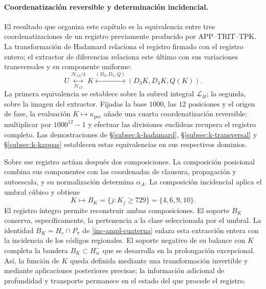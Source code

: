 \paragraph{Coordenatización reversible y determinación incidencial.}
\label{ampl-alfa-k-intro-reversible}
El resultado que organiza este capítulo es la equivalencia entre tres
coordenatizaciones de un registro previamente producido por
APP--TRIT--TPK. La transformación de Hadamard relaciona el registro
firmado con el registro entero; el extractor de diferencias relaciona
este último con sus variaciones transversales y su componente uniforme:
\[
 U\underset{\mathcal H_{12}}{\overset{\mathcal H_{12}/4}{\longleftrightarrow}}K
 \overset{(D_3,D_4,Q)}{\longleftrightarrow}
 (D_3K,D_4K,Q(K)).
\]
La primera equivalencia se establece sobre la subred integral
$\mathcal L_H$; la segunda, sobre la imagen del extractor. Fijadas la
base $1000$, las $12$ posiciones y el origen de fase, la evaluación
$K\mapsto\kappa_{\mathrm{per}}$ añade una cuarta coordenatización
reversible: multiplicar por $1000^{12}-1$ y efectuar las divisiones
euclídeas recupera el registro completo. Las demostraciones de
\S\ref{subsec:k-hadamard}, \S\ref{subsec:k-transversal} y
\S\ref{subsec:k-kappas} establecen estas equivalencias en sus respectivos
dominios.

Sobre ese registro actúan después dos composiciones. La composición
posicional combina sus componentes con las coordenadas de clausura,
propagación y autoescala, y su normalización determina $\alpha_A$. La
composición incidencial aplica el umbral cúbico y obtiene
\[
 K\longmapsto B_K=\{j:K_j\geq729\}=\{4,6,9,10\}.
\]
El registro íntegro permite reconstruir ambas composiciones. El soporte
$B_K$ conserva, específicamente, la pertenencia a la clase seleccionada
por el umbral. La identidad $B_K=H_e\cap P_\pi$ de
\eqref{inc-ampl-cuaterna} enlaza esta extracción entera con la incidencia
de los códigos regionales. El soporte negativo de su balance con $K$
completa la bandera $B_K\subset H^-_\alpha$ que se desarrolla en la
prolongación excepcional. Así, la función de $K$ queda definida mediante
una transformación invertible y mediante aplicaciones posteriores
precisas; la información adicional de profundidad y transporte permanece
en el estado del que procede el registro.
